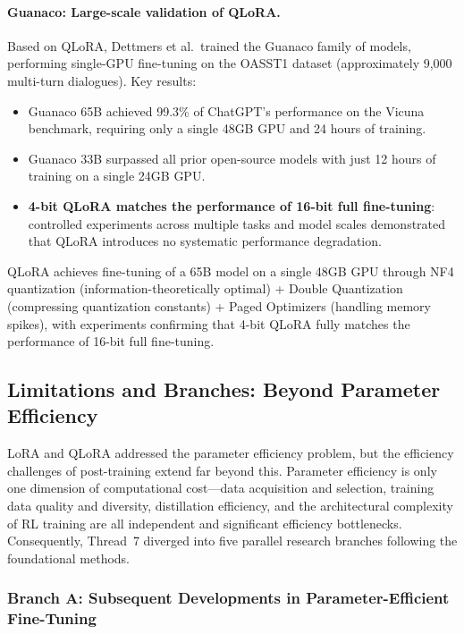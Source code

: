 \paragraph{Guanaco: Large-scale validation of QLoRA.}
Based on QLoRA, Dettmers et al.\ trained the Guanaco family of models,
performing single-GPU fine-tuning on the OASST1 dataset (approximately 9,000 multi-turn dialogues).
Key results:
\begin{itemize}[leftmargin=2em]
  \item Guanaco 65B achieved 99.3\% of ChatGPT's performance on the Vicuna benchmark,
    requiring only a single 48GB GPU and 24 hours of training.
  \item Guanaco 33B surpassed all prior open-source models with just 12 hours of training on a single 24GB GPU.
  \item \textbf{4-bit QLoRA matches the performance of 16-bit full fine-tuning}:
    controlled experiments across multiple tasks and model scales demonstrated that
    QLoRA introduces no systematic performance degradation.
\end{itemize}

\begin{solutionbox}
QLoRA achieves fine-tuning of a 65B model on a single 48GB GPU through
NF4 quantization (information-theoretically optimal) + Double Quantization (compressing quantization constants)
+ Paged Optimizers (handling memory spikes),
with experiments confirming that 4-bit QLoRA fully matches the performance of 16-bit full fine-tuning.
\end{solutionbox}

\subsection{Limitations and Branches: Beyond Parameter Efficiency}
\label{sec:t7-branches}

LoRA and QLoRA addressed the parameter efficiency problem, but the efficiency challenges of post-training extend far beyond this.
Parameter efficiency is only one dimension of computational cost---data acquisition and selection, training data quality and diversity, distillation efficiency, and the architectural complexity of RL training are all independent and significant efficiency bottlenecks.
Consequently, Thread~7 diverged into five parallel research branches following the foundational methods.

\subsubsection{Branch A: Subsequent Developments in Parameter-Efficient Fine-Tuning}
\label{sec:t7-peft}

